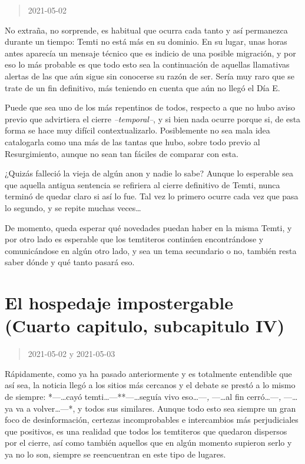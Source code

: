 \documentclass[
  spanish,
]{book}
\begin{document}
\begin{quote}
2021-05-02
\end{quote}

No extraña, no sorprende, es habitual que ocurra cada tanto y así permanezca durante un tiempo: Temti no está más en su dominio. En su lugar, unas horas antes aparecía un mensaje técnico que es indicio de una posible migración, y por eso lo más probable es que todo esto sea la continuación de aquellas llamativas alertas de las que aún sigue sin conocerse su razón de ser. Sería muy raro que se trate de un fin definitivo, más teniendo en cuenta que aún no llegó el Día E.

Puede que sea uno de los más repentinos de todos, respecto a que no hubo aviso previo que advirtiera el cierre \emph{--temporal--}, y si bien nada ocurre porque si, de esta forma se hace muy difícil contextualizarlo. Posiblemente no sea mala idea catalogarla como una más de las tantas que hubo, sobre todo previo al Resurgimiento, aunque no sean tan fáciles de comparar con esta.

¿Quizás falleció la vieja de algún anon y nadie lo sabe? Aunque lo esperable sea que aquella antigua sentencia se refiriera al cierre definitivo de Temti, nunca terminó de quedar claro si así lo fue. Tal vez lo primero ocurre cada vez que pasa lo segundo, y se repite muchas veces\ldots{}

De momento, queda esperar qué novedades puedan haber en la misma Temti, y por otro lado es esperable que los temtiteros continúen encontrándose y comunicándose en algún otro lado, y sea un tema secundario o no, también resta saber dónde y qué tanto pasará eso.

\hypertarget{el-hospedaje-impostergable-cuarto-capitulo-subcapitulo-iv}{%
\section{El hospedaje impostergable (Cuarto capitulo, subcapitulo IV)}\label{el-hospedaje-impostergable-cuarto-capitulo-subcapitulo-iv}}

\begin{quote}
2021-05-02 y 2021-05-03
\end{quote}

Rápidamente, como ya ha pasado anteriormente y es totalmente entendible que así sea, la noticia llegó a los sitios más cercanos y el debate se prestó a lo mismo de siempre: *---\ldots cayó temti\ldots---**---\ldots seguía vivo eso\ldots---\emph{, }---\ldots al fin cerró\ldots---\emph{, }---\ldots ya va a volver\ldots---*, y todos sus similares. Aunque todo esto sea siempre un gran foco de desinformación, certezas incomprobables e intercambios más perjudiciales que positivos, es una realidad que todos los temtiteros que quedaron dispersos por el cierre, así como también aquellos que en algún momento supieron serlo y ya no lo son, siempre se reencuentran en este tipo de lugares.
\end{document}
